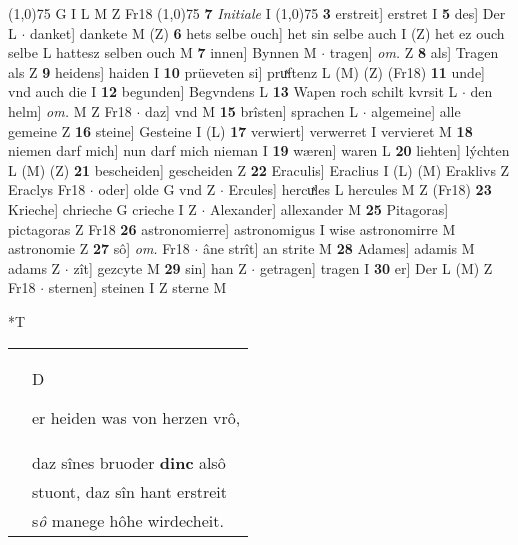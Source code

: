 \documentclass[8pt,a4paper,notitlepage]{article}
\begin{document}
\begin{table}[ht]
\begin{minipage}[t]{0.5\linewidth}
\begin{tabular}{rl}
\end{tabular}
\scriptsize
\line(1,0){75} \newline
G I L M Z Fr18 \newline
\line(1,0){75} \newline
\textbf{7} \textit{Initiale} I  \newline
\line(1,0){75} \newline
\textbf{3} erstreit] erstret I \textbf{5} des] Der L  $\cdot$ danket] dankete M (Z) \textbf{6} hets selbe ouch] het sin selbe auch I (Z) het ez ouch selbe L hattesz selben ouch M \textbf{7} innen] Bynnen M  $\cdot$ tragen] \textit{om.} Z \textbf{8} als] Tragen als Z \textbf{9} heidens] haiden I \textbf{10} prüeveten si] pruͯftenz L (M) (Z) (Fr18) \textbf{11} unde] vnd auch die I \textbf{12} begunden] Begvndens L \textbf{13} Wapen roch schilt kvrsit L  $\cdot$ den helm] \textit{om.} M Z Fr18  $\cdot$ daz] vnd M \textbf{15} brîsten] sprachen L  $\cdot$ algemeine] alle gemeine Z \textbf{16} steine] Gesteine I (L) \textbf{17} verwiert] verwerret I vervieret M \textbf{18} niemen darf mich] nun darf mich nieman I \textbf{19} wæren] waren L \textbf{20} liehten] lýchten L (M) (Z) \textbf{21} bescheiden] gescheiden Z \textbf{22} Eraculis] Eraclius I (L) (M) Eraklivs Z Eraclys Fr18  $\cdot$ oder] olde G vnd Z  $\cdot$ Ercules] hercuͯles L hercules M Z (Fr18) \textbf{23} Krieche] chrieche G crieche I Z  $\cdot$ Alexander] allexander M \textbf{25} Pitagoras] pictagoras Z Fr18 \textbf{26} astronomierre] astronomigus I wise astronomirre M astronomie Z \textbf{27} sô] \textit{om.} Fr18  $\cdot$ âne strît] an strite M \textbf{28} Adames] adamis M adams Z  $\cdot$ zît] gezcyte M \textbf{29} sin] han Z  $\cdot$ getragen] tragen I \textbf{30} er] Der L (M) Z Fr18  $\cdot$ sternen] steinen I Z sterne M \newline
\end{minipage}
\hspace{0.5cm}
\begin{minipage}[t]{0.5\linewidth}
\small
\begin{center}*T
\end{center}
\begin{tabular}{rl}
 & \begin{large}D\end{large}er heiden was von herzen vrô,\\ 
 & daz sînes bruoder \textbf{dinc} alsô\\ 
 & stuont, daz sîn hant erstreit\\ 
 & s\textit{ô} manege hôhe wirdecheit.\\ 

\end{tabular}
\end{minipage}
\end{table}
\end{document}

